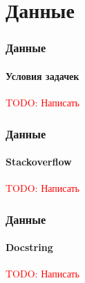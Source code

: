 \documentclass[10pt]{beamer}
\newcommand\TODO[1]{\textcolor{red}{{\Large TODO: #1}}}
\begin{document}
\section{Данные}
\begin{frame}
\frametitle{Данные}
\framesubtitle{Условия задачек}

\TODO{Написать}

\end{frame}
\begin{frame}
\frametitle{Данные}
\framesubtitle{Stackoverflow}

\TODO{Написать}

\end{frame}
\begin{frame}
\frametitle{Данные}
\framesubtitle{Docstring}

\TODO{Написать}

\end{frame}
\end{document}
